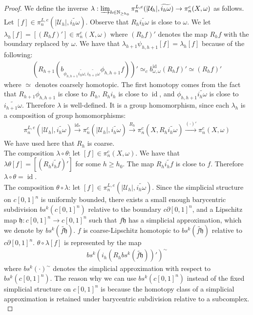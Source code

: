 \documentclass[a4paper,11pt]{article}
\theoremstyle{definition}
\theoremstyle{plain}
\theoremstyle{remark}
\DeclareMathOperator{\id}{id}
\begin{document}
{\begin{proof}
We define the inverse $\lambda:  \varinjlim_{h\in \mathbb{N}_{\geq h_0}}\pi^{L,e}_{n}(|\mathcal{U}_{h}|, \widetilde{i_{h}\omega})  \rightarrow \pi_{n}^{c}(X,\omega)$ as follows. Let $[f]\in \pi^{L,e}_{n}(|\mathcal{U}_{h}|, \widetilde{i_{h}\omega})$. Observe that $R_{h}\widetilde{i_{h}\omega}$ is close to $\omega$. We let $\lambda_{h}[f] = [(R_{h}f)'] \in \pi_{n}^{c}(X,\omega)$ where $(R_{h}f)'$ denotes the map $R_{h}f$ with the boundary replaced by $\omega$. We have that $\lambda_{h+1}\psi_{h,h+1}[f] = \lambda_{h}[f]$ because of the following:
\begin{align*}
(R_{h+1}(b_{\phi_{h,h+1}\widetilde{i_{h}\omega},\widetilde{i_{h+1}\omega}}\phi_{h,h+1}f))'
 \simeq_{c} b^{\id}_{\omega,\omega}(R_{h}f)' \simeq (R_{h}f)' 
\end{align*}
where $\simeq$ denotes coarsely homotopic. The first homotopy comes from the fact that $R_{h+1}\phi_{h,h+1}$ is close to $R_{h}$, $R_{h}i_{h}$ is close to $\id$, and $\phi_{h,h+1} \widetilde{i_{h}\omega}$ is close to $\widetilde{i_{h+1}\omega}$.  Therefore $\lambda$ is well-defined. It is a group homomorphism, since each $\lambda_{h}$ is a composition of group homomorphisms:
\begin{align*}
\pi^{L,e}_{n}(|\mathcal{U}_{h}|, \widetilde{i_{h}\omega}) \xrightarrow{\id_{*}}\pi^{c}_{n}(|\mathcal{U}_{h}|, \widetilde{i_{h}\omega})  \xrightarrow{R_{h}}  \pi_{n}^{c}(X,R_{h}\widetilde{i_{h}\omega})  \xrightarrow{(\cdot)'} \pi_{n}^{c}(X,\omega)
\end{align*}
We have used here that $R_{h}$ is coarse.\\

The composition $\lambda \circ \theta$: let $[f]\in \pi_{n}^{c}(X,\omega)$. We have that $\lambda \theta[f] =  [(R_{h}\widetilde{i_{h}f})']$ for some $h\geq h_0$. The map $R_{h}\widetilde{i_{h}f}$ is close to $f$. Therefore $\lambda \circ \theta = \id$. \\

The composition $\theta \circ \lambda$: let $[f]\in \pi_{n}^{L,e}(|\mathcal{U}_{h}|,\widetilde{i_{h}\omega})$. Since the simplicial structure on $c[0,1]^n$ is uniformly bounded, there exists a small enough barycentric subdivision $bs^k(c[0,1]^n)$ relative to the boundary $c\partial[0,1]^n$, and a Lipschitz map $\mathfrak{h}: c[0,1]^n\rightarrow c[0,1]^n$ such that $f\mathfrak{h}$ has a simplicial approximation, which we denote by $bs^k (\widetilde{f\mathfrak{h}})$. $f$ is coarse-Lipschitz homotopic to $bs^{k}(\widetilde{f\mathfrak{h}})$ relative to $c\partial[0,1]^n$. $\theta \circ \lambda [f]$ is represented by the map 
\begin{align*}
bs^k (i_{h}{(R_{h}bs^k (\widetilde{f\mathfrak{h}}))'})^{\sim}
\end{align*}
where $bs^{k}(\cdot)^{\sim}$ denotes the simplicial approximation with respect to $bs^k(c[0,1]^n)$. The reason why we can use $bs^k(c[0,1]^n)$ instead of the fixed simplicial structure on $c[0,1]^n$ is because the homotopy class of a simplicial approximation is retained under barycentric subdivision relative to a subcomplex. \\


\end{proof}}
\end{document}
